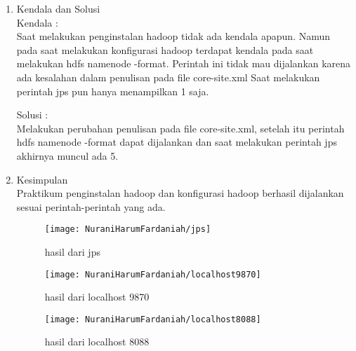 
\begin{enumerate}
\item Kendala dan Solusi \\
Kendala :\\
Saat melakukan penginstalan hadoop tidak ada kendala apapun. Namun pada saat melakukan konfigurasi hadoop terdapat kendala pada saat melakukan hdfs namenode -format. Perintah ini tidak mau dijalankan karena ada kesalahan dalam penulisan pada file core-site.xml
Saat melakukan perintah jps pun hanya menampilkan 1 saja.

Solusi :\\
Melakukan perubahan penulisan pada file core-site.xml, setelah itu perintah hdfs namenode -format dapat dijalankan dan saat melakukan perintah jps akhirnya muncul ada 5.

\item Kesimpulan \\
Praktikum penginstalan hadoop dan konfigurasi hadoop berhasil dijalankan sesuai perintah-perintah yang ada.

\begin{figure}[!ht]
\texttt{[image: NuraniHarumFardaniah/jps]}
\caption{hasil dari jps}
\label{gam:perkuliahan-25-11}
\end{figure}

\begin{figure}[!ht]
\texttt{[image: NuraniHarumFardaniah/localhost9870]}
\caption{hasil dari localhost 9870}
\label{gam:perkuliahan-25-11}
\end{figure}

\newpage
\begin{figure}[!ht]
\texttt{[image: NuraniHarumFardaniah/localhost8088]}
\caption{hasil dari localhost 8088}
\label{gam:perkuliahan-25-11}
\end{figure}

\end{enumerate}

